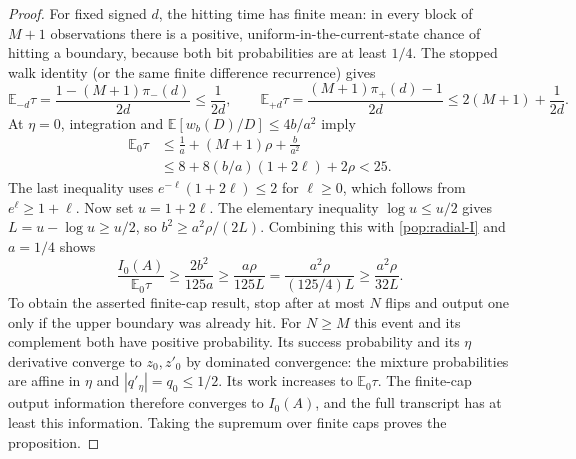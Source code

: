 \begin{proof}
For fixed signed $d$, the hitting time has finite mean: in every block of
$M+1$ observations there is a positive, uniform-in-the-current-state chance
of hitting a boundary, because both bit probabilities are at least $1/4$.
The stopped walk identity (or the same finite difference recurrence) gives
\[
 \mathbb E_{-d}\tau=\frac{1-(M+1)\pi_-(d)}{2d}\le\frac1{2d},
 \qquad
 \mathbb E_{+d}\tau
 =\frac{(M+1)\pi_+(d)-1}{2d}
 \le2(M+1)+\frac1{2d}.
\]
At $\eta=0$, integration and
$\mathbb E[w_b(D)/D]\le4b/a^2$ imply
\begin{align*}
 \mathbb E_0\tau
 &\le\frac1a+(M+1)\rho+\frac b{a^2}\\
 &\le8+8(b/a)(1+2\ell)+2\rho<25.
\end{align*}
The last inequality uses $e^{-\ell}(1+2\ell)\le2$ for $\ell\ge0$,
which follows from $e^\ell\ge1+\ell$.
Now set $u=1+2\ell$. The elementary inequality $\log u\le u/2$ gives
$L=u-\log u\ge u/2$, so $b^2\ge a^2\rho/(2L)$.
Combining this with \eqref{pop:radial-I} and $a=1/4$ shows
\[
 \frac{I_0(A)}{\mathbb E_0\tau}
 \ge\frac{2b^2}{125a}
 \ge\frac{a\rho}{125L}
 =\frac{a^2\rho}{(125/4)L}
 \ge\frac{a^2\rho}{32L}.
\]
To obtain the asserted finite-cap result, stop after at most $N$ flips
and output one only if the upper boundary was already hit. For $N\ge M$
this event and its complement both have positive probability. Its success
probability and its $\eta$ derivative converge to $z_0,z'_0$ by dominated
convergence: the mixture probabilities are affine in $\eta$ and
$|q'_\eta|=q_0\le1/2$. Its work increases to $\mathbb E_0\tau$.
The finite-cap output information therefore converges to $I_0(A)$, and
the full transcript has at least this information. Taking the supremum
over finite caps proves the proposition.
\end{proof}

